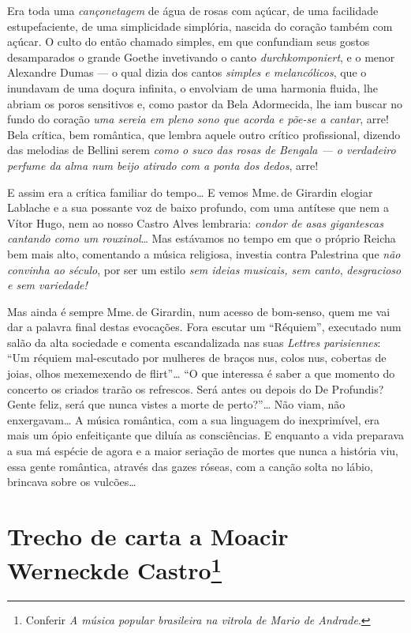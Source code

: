 Era toda uma \textit{cançonetagem} de água de rosas com açúcar, de uma facilidade
estupefaciente, de uma simplicidade simplória, nascida do coração também
com açúcar. O culto do então chamado simples, em que confundiam seus
gostos desamparados o grande Goethe invetivando o canto
\textit{durchkomponiert}, e o menor Alexandre Dumas --- o qual dizia dos
cantos \textit{simples e melancólicos}, que o inundavam de uma doçura
infinita, o envolviam de uma harmonia fluida, lhe abriam os poros
sensitivos e, como pastor da Bela Adormecida, lhe iam buscar no fundo do
coração \textit{uma sereia em pleno sono que acorda e põe-se a cantar}, arre!
Bela crítica, bem romântica, que lembra aquele outro crítico
profissional, dizendo das melodias de Bellini serem \textit{como o suco das
rosas de Bengala --- o verdadeiro perfume da alma num beijo atirado com a
ponta dos dedos}, arre!

E assim era a crítica familiar do tempo\ldots{} E vemos Mme.\,de Girardin
elogiar Lablache e a sua possante voz de baixo profundo, com uma
antítese que nem a Vítor Hugo, nem ao nosso Castro Alves lembraria:
\textit{condor de asas gigantescas cantando como um rouxinol}\ldots{} Mas
estávamos no tempo em que o próprio Reicha bem mais alto, comentando a
música religiosa, investia contra Palestrina que \textit{não convinha ao
século}, por ser um estilo \textit{sem ideias musicais, sem canto},
\textit{desgracioso e sem variedade!}

Mas ainda é sempre Mme.\,de Girardin, num acesso de bom-senso, quem me
vai dar a palavra final destas evocações. Fora escutar um ``Réquiem'',
executado num salão da alta sociedade e comenta escandalizada nas suas
\textit{Lettres parisiennes}: ``Um réquiem mal-escutado por mulheres de braços
nus, colos nus, cobertas de joias, olhos mexemexendo de flirt''\ldots{} ``O
que interessa é saber a que momento do concerto os criados trarão os
refrescos. Será antes ou depois do De Profundis? Gente feliz, será que
nunca vistes a morte de perto?''\ldots{} Não viam, não enxergavam\ldots{} A música
romântica, com a sua linguagem do inexprimível, era mais um ópio
enfeitiçante que diluía as consciências. E enquanto a vida preparava a
sua má espécie de agora e a maior seriação de mortes que nunca a
história viu, essa gente romântica, através das gazes róseas, com a
canção solta no lábio, brincava sobre os vulcões\ldots{}


\chapter[Trecho de carta a Moacir Werneck de Castro]{Trecho de carta a Moacir Werneck\break de Castro\footnote{Conferir \textit{A música popular brasileira na vitrola de Mario de Andrade}.}}

